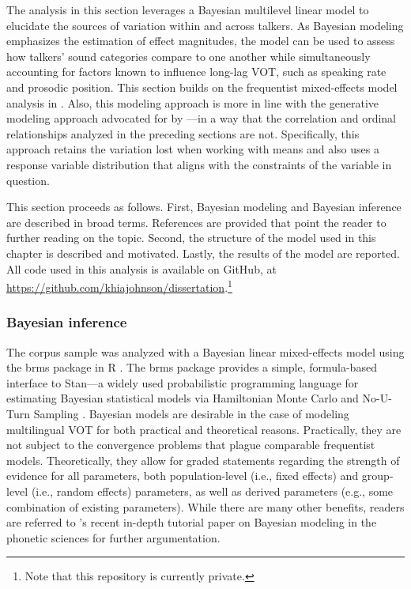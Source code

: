 The analysis in this section leverages a Bayesian multilevel linear model to elucidate the sources of variation within and across talkers. As Bayesian modeling emphasizes the estimation of effect magnitudes, the model can be used to assess how talkers' sound categories compare to one another while simultaneously accounting for factors known to influence long-lag VOT, such as speaking rate and prosodic position. This section builds on the frequentist mixed-effects model analysis in \citet{chodroff_2017_structure}. Also, this modeling approach is more in line with the generative modeling approach advocated for by \citet{haines_2020_theoretically}---in a way that the correlation and ordinal relationships analyzed in the preceding sections are not. Specifically, this approach retains the variation lost when working with means and also uses a response variable distribution that aligns with the constraints of the variable in question. 

This section proceeds as follows. First, Bayesian modeling and Bayesian inference are described in broad terms. References are provided that point the reader to further reading on the topic. Second, the structure of the model used in this chapter is described and motivated. Lastly, the results of the model are reported. All code used in this analysis is available on GitHub, at \url{https://github.com/khiajohnson/dissertation}.\footnote{Note that this repository is currently private.}

\subsubsection{Bayesian inference}

The corpus sample was analyzed with a Bayesian linear mixed-effects model using the brms package in R \citep{burkner_2017_brms, r_2021}. The brms package provides a simple, formula-based interface to Stan---a widely used probabilistic programming language for estimating Bayesian statistical models via Hamiltonian Monte Carlo and No-U-Turn Sampling \citep{stan_2021}. Bayesian models are desirable in the case of modeling multilingual VOT for both practical and theoretical reasons. Practically, they are not subject to the convergence problems that plague comparable frequentist models. Theoretically, they allow for graded statements regarding the strength of evidence for all parameters, both population-level (i.e., fixed effects) and group-level (i.e., random effects) parameters, as well as derived parameters (e.g., some combination of existing parameters). While there are many other benefits, readers are referred to \citeauthor{vasishth_2018_bayesian}'s \citeyearpar{vasishth_2018_bayesian} recent in-depth tutorial paper on Bayesian modeling in the phonetic sciences for further argumentation. 

